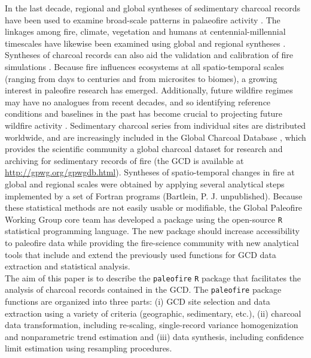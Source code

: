 \documentclass{elsarticle}
\begin{document}
In the last decade, regional and global syntheses of sedimentary charcoal records have been used to examine broad-scale patterns in palaeofire activity \citep{Carcaillet2002,Power2008,Daniau2012}. The linkages among fire, climate, vegetation and humans at centennial-millennial timescales have likewise been examined using global and regional syntheses \citep{Marlon2008, Ali2012}. Syntheses of charcoal records can also aid the validation and calibration of fire simulations \citep{Flannigan2001,Pechony2009,Girardin2013,Brucher2014}. Because fire influences ecosystems at all spatio-temporal scales (ranging from days to centuries and from microsites to biomes), a growing interest in paleofire research has emerged. Additionally, future wildfire regimes may have no analogues from recent decades, and so identifying reference conditions and baselines in the past has become crucial to projecting future wildfire activity \citep{Girardin2013}. Sedimentary charcoal series from individual sites are distributed worldwide, and are increasingly included in the Global Charcoal Database \citep[GCD]{Power2010}, which provides the scientific community a global charcoal dataset for research and archiving for sedimentary records of fire (the GCD is available at \url{http://gpwg.org/gpwgdb.html}). Syntheses of spatio-temporal changes in fire at global \citep{Marlon2008, Power2008, Daniau2012, Marlon2013} and regional \citep{Marlon2009, Mooney2011, Vanniere2011, Power2013} scales were obtained by applying several analytical steps implemented by a set of Fortran programs (Bartlein, P. J. unpublished). Because these statistical methods are not easily usable or modifiable, the Global Paleofire Working Group core team has developed a package using the open-source \texttt{R} statistical programming language. The new package should increase accessibility to paleofire data while providing the fire-science community with new analytical tools that include and extend the previously used functions for GCD data extraction and statistical analysis.
\\
The aim of this paper is to describe the \texttt{paleofire} \texttt{R} package that facilitates the analysis of charcoal records contained in the GCD. The \texttt{paleofire} package functions are organized into three parts: 
(i) GCD site selection and data extraction using a variety of criteria (geographic, sedimentary, etc.), (ii) charcoal data transformation, including re-scaling, single-record variance homogenization and nonparametric trend estimation and (iii) data synthesis, including confidence limit estimation using resampling procedures.
\end{document}
